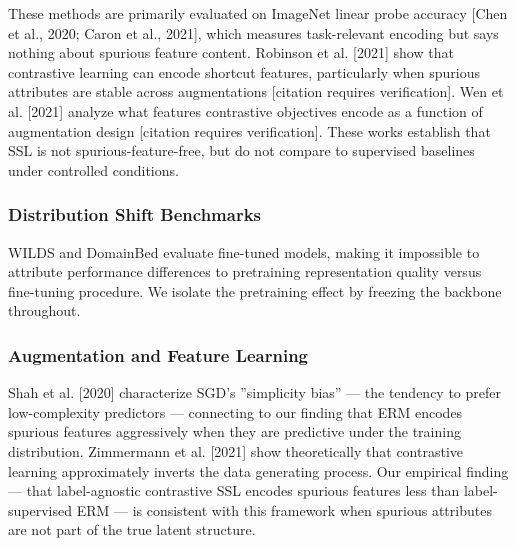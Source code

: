 These methods are primarily evaluated on ImageNet linear probe accuracy [Chen et al., 2020; Caron et al., 2021], which measures task-relevant encoding but says nothing about spurious feature content. Robinson et al. [2021] show that contrastive learning can encode shortcut features, particularly when spurious attributes are stable across augmentations [citation requires verification]. Wen et al. [2021] analyze what features contrastive objectives encode as a function of augmentation design [citation requires verification]. These works establish that SSL is not spurious-feature-free, but do not compare to supervised baselines under controlled conditions.

\subsubsection{Distribution Shift Benchmarks}

WILDS \citep{Koh2021WILDS} and DomainBed \citep{Gulrajani2021DomainBed} evaluate fine-tuned models, making it impossible to attribute performance differences to pretraining representation quality versus fine-tuning procedure. We isolate the pretraining effect by freezing the backbone throughout.

\subsubsection{Augmentation and Feature Learning}

Shah et al. [2020] characterize SGD's ''simplicity bias'' --- the tendency to prefer low-complexity predictors --- connecting to our finding that ERM encodes spurious features aggressively when they are predictive under the training distribution. Zimmermann et al. [2021] show theoretically that contrastive learning approximately inverts the data generating process. Our empirical finding --- that label-agnostic contrastive SSL encodes spurious features less than label-supervised ERM --- is consistent with this framework when spurious attributes are not part of the true latent structure.

